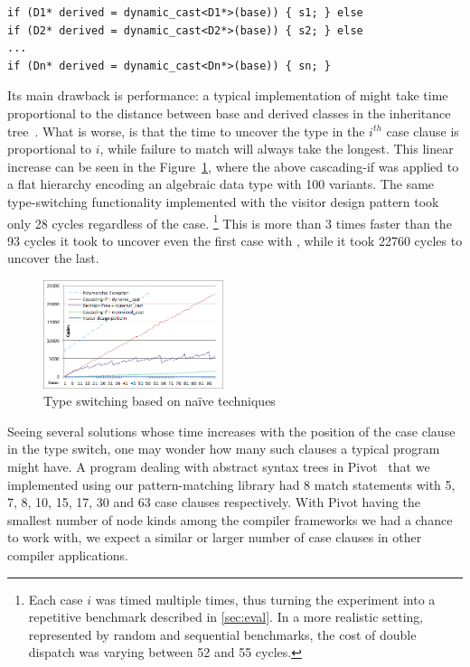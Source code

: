 \begin{lstlisting}
if (D1* derived = dynamic_cast<D1*>(base)) { s1; } else
if (D2* derived = dynamic_cast<D2*>(base)) { s2; } else
...
if (Dn* derived = dynamic_cast<Dn*>(base)) { sn; }
\end{lstlisting}

\noindent
Its main drawback is performance: a typical 
implementation of  might take time proportional to the 
distance between base and derived classes in the inheritance tree~\cite{XXXXX}.
What is worse, is that the time to uncover the type in the $i^{th}$ case clause 
is proportional to $i$, while failure to match will always take the longest. 
This linear increase can be seen in the Figure~\ref{fig:DCastVis1}, where 
the above cascading-if was applied to a flat hierarchy encoding an algebraic 
data type with 100 variants. The same type-switching functionality implemented 
with the visitor design pattern took only 28 cycles regardless of the case.
\footnote{Each case $i$ was timed multiple times, thus turning the experiment 
into a repetitive benchmark described in \textsection\ref{sec:eval}. In a more
realistic setting, represented by random and sequential benchmarks, the cost of 
double dispatch was varying between 52 and 55 cycles.}
This is more than 3 times faster than the 93 cycles it took to uncover even the 
first case with , while it took 22760 cycles to uncover the 
last.

\begin{figure}[htbp]
  \centering
    \includegraphics[width=0.47\textwidth]{DCast-vs-Visitors1.png}
  \caption{Type switching based on na\"ive techniques}
  \label{fig:DCastVis1}
\end{figure}

Seeing several solutions whose time increases with the position of the case 
clause in the type switch, one may wonder how many such clauses a typical 
program might have. A program dealing with abstract syntax trees in 
Pivot~\cite{Pivot09} that we implemented using our pattern-matching library had 
8 match statements with 5, 7, 8, 10, 15, 17, 30 and 63 case clauses 
respectively. With Pivot having the smallest number of node kinds among the 
compiler frameworks we had a chance to work with, we expect a similar or larger 
number of case clauses in other compiler applications.

